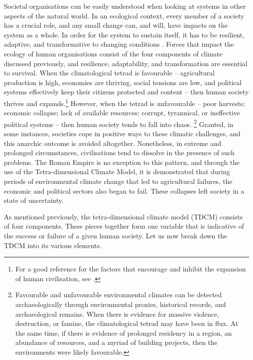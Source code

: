 	Societal organisations can be easily understood when looking at systems in other aspects of the natural world. In an ecological context, every member of a society has a crucial role, and any small change can, and will, have impacts on the system as a whole. In order for the system to sustain itself, it has to be resilient, adaptive, and transformative to changing conditions \parencite{Walker_2004}. Forces that impact the ecology of human organisations consist of the four components of climate discussed previously, and resilience, adaptability, and transformation are essential to survival. When the climatological tetrad is favourable – agricultural production is high, economies are thriving, social tensions are low, and political systems effectively keep their citizens protected and content – then human society thrives and expands.\footnote{For a good reference for the factors that encourage and inhibit the expansion of human civilisation, see \textcite{Diamond_1997}.} 
However, when the tetrad is unfavourable – poor harvests; economic collapse; lack of available resources; corrupt, tyrannical, or ineffective political systems – then human society tends to fall into chaos. \footnote{Favourable and unfavourable environmental climates can be detected archaeologically through environmental proxies, historical records, and archaeological remains. When there is evidence for massive violence, destruction, or famine, the climatological tetrad may have been in flux. At the same time, if there is evidence of prolonged residency in a region, an abundance of resources, and a myriad of building projects, then the environments were likely favourable.} Granted, in some instances, societies cope in positive ways to these climatic challenges, and this anarchic outcome is avoided altogether. Nonetheless, in extreme and prolonged circumstances, civilisations tend to dissolve in the presence of such problems. 
The Roman Empire is no exception to this pattern, and through the use of the Tetra-dimensional Climate Model, it is demonstrated that during periods of environmental climate change that led to agricultural failures, the economic and political sectors also began to fail. These collapses left society in a state of uncertainty. 

As mentioned previously, the tetra-dimensional climate model (TDCM) consists of four components. These pieces together form one variable that is indicative of the success or failure of a given human society. Let us now break down the TDCM into its various elements.

